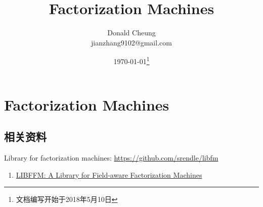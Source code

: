 \ifx\mlnotes\undefined
    \providecommand{\notesroot}{../..}
    \providecommand{\fmroot}{.}

    \title{Factorization Machines}
    \author{Donald Cheung\\jianzhang9102@gmail.com}
    \date{\today\footnote{文档编写开始于2018年5月10日}}

    
\else
    \providecommand{\fmroot}{\mlroot/fm}
\fi

\chapter{Factorization Machines}

\section{相关资料}
Library for factorization machines: \url{https://github.com/srendle/libfm}

\begin{enumerate}
    \item \href{https://www.csie.ntu.edu.tw/~r01922136/libffm/}{LIBFFM: A Library for Field-aware Factorization Machines}
\end{enumerate}

\ifx\mlnotes\undefined
    
\fi
